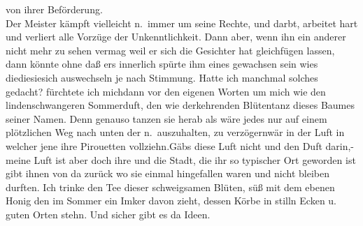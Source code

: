 \documentclass[
]{article}
\begin{document}
von ihrer Beförderung.\\
Der Meister kämpft vielleicht n.~immer um seine Rechte, und darbt,
arbeitet hart und verliert alle Vorzüge der Unkenntlichkeit. Dann aber,
wenn ihn ein anderer nicht mehr zu sehen vermag weil er sich die
Gesichter hat gleichfügen lassen, dann könnte ohne daß ers innerlich
spürte ihm eines gewachsen sein wies diediesiesich auswechseln je nach
Stimmung. Hatte ich manchmal solches gedacht? fürchtete ich michdann vor
den eigenen Worten um mich wie den lindenschwangeren Sommerduft, den wie
derkehrenden Blütentanz dieses Baumes seiner Namen. Denn genauso tanzen
sie herab als wäre jedes nur auf einem plötzlichen Weg nach unten der
n.~auszuhalten, zu verzögernwär in der Luft in welcher jene ihre
Pirouetten vollziehn.Gäbs diese Luft nicht und den Duft darin,- meine
Luft ist aber doch ihre und die Stadt, die ihr so typischer Ort geworden
ist gibt ihnen von da zurück wo sie einmal hingefallen waren und nicht
bleiben durften. Ich trinke den Tee dieser schweigsamen Blüten, süß mit
dem ebenen Honig den im Sommer ein Imker davon zieht, dessen Körbe in
stilln Ecken u. guten Orten stehn. Und sicher gibt es da Ideen.
\end{document}
